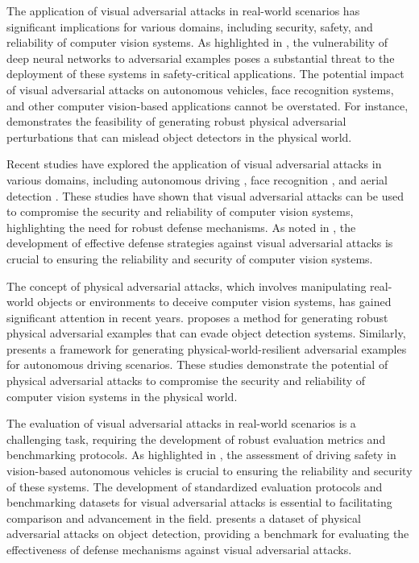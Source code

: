 \documentclass[11pt,a4paper]{article}
\begin{document}
The application of visual adversarial attacks in real-world scenarios has significant implications for various domains, including security, safety, and reliability of computer vision systems. As highlighted in \cite{doi:10.24963/ijcai.2021/694}, the vulnerability of deep neural networks to adversarial examples poses a substantial threat to the deployment of these systems in safety-critical applications. The potential impact of visual adversarial attacks on autonomous vehicles, face recognition systems, and other computer vision-based applications cannot be overstated. For instance, \cite{arxiv:1707.08945} demonstrates the feasibility of generating robust physical adversarial perturbations that can mislead object detectors in the physical world.

Recent studies have explored the application of visual adversarial attacks in various domains, including autonomous driving \cite{doi:10.1016/j.sysarc.2020.101766}, face recognition \cite{doi:10.1609/aaai.v32i1.12341}, and aerial detection \cite{doi:10.1109/tgrs.2022.3225306}. These studies have shown that visual adversarial attacks can be used to compromise the security and reliability of computer vision systems, highlighting the need for robust defense mechanisms. As noted in \cite{doi:10.1016/j.eng.2019.12.012}, the development of effective defense strategies against visual adversarial attacks is crucial to ensuring the reliability and security of computer vision systems.

The concept of physical adversarial attacks, which involves manipulating real-world objects or environments to deceive computer vision systems, has gained significant attention in recent years. \cite{doi:10.1007/978-3-030-10925-7_4} proposes a method for generating robust physical adversarial examples that can evade object detection systems. Similarly, \cite{doi:10.1109/cvpr42600.2020.01426} presents a framework for generating physical-world-resilient adversarial examples for autonomous driving scenarios. These studies demonstrate the potential of physical adversarial attacks to compromise the security and reliability of computer vision systems in the physical world.

The evaluation of visual adversarial attacks in real-world scenarios is a challenging task, requiring the development of robust evaluation metrics and benchmarking protocols. As highlighted in \cite{doi:10.1109/jiot.2021.3099164}, the assessment of driving safety in vision-based autonomous vehicles is crucial to ensuring the reliability and security of these systems. The development of standardized evaluation protocols and benchmarking datasets for visual adversarial attacks is essential to facilitating comparison and advancement in the field. \cite{doi:10.1007/978-3-030-58589-1_3} presents a dataset of physical adversarial attacks on object detection, providing a benchmark for evaluating the effectiveness of defense mechanisms against visual adversarial attacks.
\end{document}
